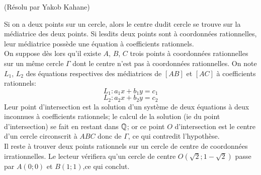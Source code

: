 \begin{sol}[133](Résolu par Yakob Kahane)

		Si on a deux points sur un cercle, alors le centre dudit cercle se trouve sur la m\'ediatrice des deux points. Si lesdits deux points sont \`a coordonn\'ees rationnelles, leur m\'ediatrice poss\`ede une \'equation \`a coefficients rationnels. \\
			On suppose d\`es lors qu'il existe $A$, $B$, $C$ trois points \`a coordonn\'ees rationnelles sur un m\^eme cercle $\Gamma$ dont le centre n'est pas \`a coordonn\'ees rationnelles. On note $L_1$, $L_2$ des \'equations respectives des m\'ediatrices de $[AB]$ et $[AC]$ \`a coefficients rationnels:
			\[L_1: a_1x+b_1y=c_1\]
			\[L_2: a_2x+b_2y=c_2\]
			Leur point d'intersection est la solution d'un syst\`eme de deux \'equations \`a deux inconnues \`a coefficients rationnels; le calcul de la solution (ie du point d'intersection) se fait en restant dans $\mathbb Q$; or ce point $O$ d'intersection est le centre d'un cercle circonscrit \`a $ABC$ donc de $\Gamma$, ce qui contredit l'hypoth\`ese. \\
			Il reste \`a trouver deux points rationnels sur un cercle de centre de coordonn\'ees irrationnelles. Le lecteur v\'erifiera qu'un cercle de centre $O(\sqrt{2};1-\sqrt{2})$ passe par $A(0;0)$ et $B(1;1)$,ce qui conclut.  
\end{sol}

